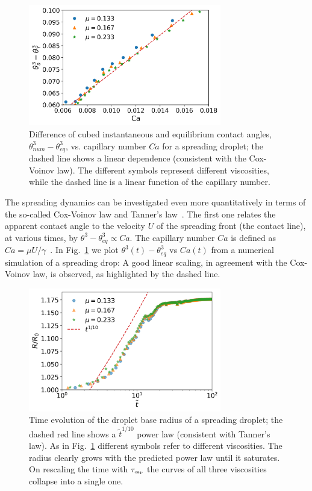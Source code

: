 \begin{figure}
    \centering 
    \includegraphics[width=0.75\textwidth]{graphics/Fig_5_Indirect_Cox_Voinov_all_data_visually_appealing_slip_2_m_nosci.png}
    \caption{Difference of cubed instantaneous and equilibrium contact angles, $\theta_{num}^3-\theta_{eq}^3$, vs. capillary number $Ca$ for a spreading droplet; the dashed line shows a linear dependence (consistent with the Cox-Voinov law). The different symbols represent different viscosities, while the dashed line is a linear function of the capillary number.}
    \label{fig:Cox-Voinov}
\end{figure}
The spreading dynamics can be investigated even more quantitatively in terms of the so-called Cox-Voinov law and Tanner's law~\cite{tannerSpreadingSiliconeOil1979}. 
The first one relates the apparent contact angle to the velocity $U$ of the spreading front (the contact line), at various times, by $\theta^3 - \theta_{eq}^3 \propto Ca$. 
The capillary number $Ca$ is defined as $Ca=\mu U/\gamma$~\cite{snoeijerMovingContactLines2013}.
In Fig.~\ref{fig:Cox-Voinov} we plot $\theta^3(t) - \theta_{eq}^3$ vs $Ca(t)$ from a numerical simulation of a spreading drop: A good linear scaling, in agreement with the Cox-Voinov law, is observed, as highlighted by the dashed line. 
\begin{figure}
    \centering
    \includegraphics[width=0.75\textwidth]{graphics/Fig_6_Tanners_law_slip_2_paper_rescaled_t.png}
    \caption{Time evolution of the droplet base radius of a spreading droplet; the dashed red line shows a $\tilde{t}^{1/10}$ power law (consistent with Tanner's law). 
    As in Fig.~\ref{fig:Cox-Voinov} different symbols refer to different viscosities. The radius clearly grows with the predicted power law until it saturates. 
    On rescaling the time with $\tau_{\mbox{\tiny{cap}}}$ the curves of all three viscosities collapse into a single one.}
    \label{fig:Tanners_law}
\end{figure}
